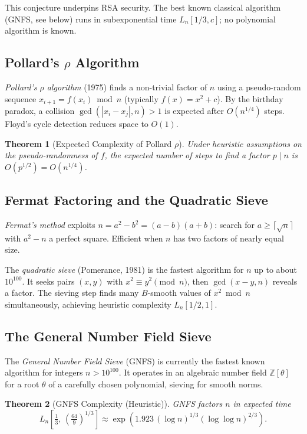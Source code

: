 \documentclass[12pt,a4paper]{amsart}
\newtheorem{theorem}{Theorem}[section]
\theoremstyle{definition}
\begin{document}
This conjecture underpins RSA security. The best known classical algorithm
(GNFS, see below) runs in subexponential time $L_n[1/3, c]$; no polynomial
algorithm is known.

\subsection{Pollard's $\rho$ Algorithm}

\emph{Pollard's $\rho$ algorithm} (1975) finds a non-trivial factor of $n$
using a pseudo-random sequence $x_{i+1} = f(x_i) \bmod n$ (typically
$f(x) = x^2 + c$). By the birthday paradox, a collision $\gcd(|x_i - x_j|, n) > 1$
is expected after $O(n^{1/4})$ steps. Floyd's cycle detection reduces space
to $O(1)$.

\begin{theorem}[Expected Complexity of Pollard $\rho$]
Under heuristic assumptions on the pseudo-randomness of $f$, the expected
number of steps to find a factor $p \mid n$ is $O(p^{1/2}) = O(n^{1/4})$.
\end{theorem}

\subsection{Fermat Factoring and the Quadratic Sieve}

\emph{Fermat's method} exploits $n = a^2 - b^2 = (a-b)(a+b)$: search for
$a \ge \lceil\sqrt{n}\rceil$ with $a^2 - n$ a perfect square. Efficient when
$n$ has two factors of nearly equal size.

The \emph{quadratic sieve} (Pomerance, 1981) is the fastest algorithm for
$n$ up to about $10^{100}$. It seeks pairs $(x, y)$ with $x^2 \equiv y^2
\pmod{n}$, then $\gcd(x - y, n)$ reveals a factor. The sieving step finds
many $B$-smooth values of $x^2 \bmod n$ simultaneously, achieving heuristic
complexity $L_n[1/2, 1]$.

\subsection{The General Number Field Sieve}

The \emph{General Number Field Sieve} (GNFS) is currently the fastest known
algorithm for integers $n > 10^{100}$. It operates in an algebraic number
field $\mathbb{Z}[\theta]$ for a root $\theta$ of a carefully chosen
polynomial, sieving for smooth norms.

\begin{theorem}[GNFS Complexity (Heuristic)]
GNFS factors $n$ in expected time
\[
  L_n\!\left[\tfrac{1}{3},\, \left(\tfrac{64}{9}\right)^{1/3}\right]
  \approx \exp\!\left(1.923\,(\log n)^{1/3}(\log\log n)^{2/3}\right).
\]
\end{theorem}
\end{document}
